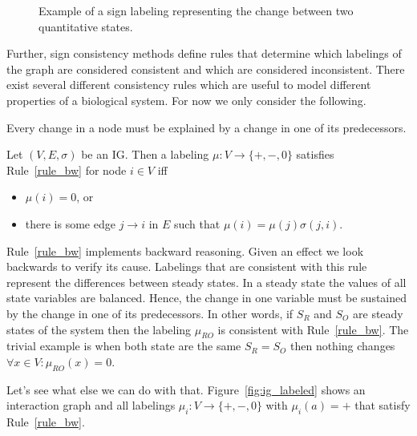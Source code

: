 \begin{figure}
  \caption{Example of a sign labeling representing the change between two quantitative states.
  }
  \label{fig:state_change}
\end{figure}

Further, sign consistency methods define rules that determine which labelings 
of the graph are considered consistent and which are considered inconsistent.
There exist several different consistency rules which are useful to model different 
properties of a biological system. 
For now we only consider the following.

\begin{srule}
\label{rule_bw}
{\upshape Every change in a node must be explained by a change in one of its predecessors.}

Let $(V, E, \sigma)$ be an IG.
Then a labeling $\mu : V \rightarrow \{\plus, \minus, 0\}$ satisfies Rule~\ref{rule_bw} for node $i \in V$ iff
\begin{itemize}
 \item $\mu(i) = 0$, or
 \item there is some edge $j \rightarrow i$ in $E$ 
       such that $\mu(i)=\mu(j)\sigma(j,i)$.
\end{itemize}

 
\end{srule}

Rule~\ref{rule_bw} implements backward reasoning.
Given an effect we look backwards to verify its cause.
Labelings that are consistent with this rule represent the differences between steady states.
In a steady state the values of all state variables are balanced. 
Hence, the change in one variable must be sustained by the change in one of its predecessors.
In other words,
 if $S_R$ and $S_O$ are steady states of the system
 then the labeling $\mu_{RO}$ is consistent with Rule~\ref{rule_bw}.
The trivial example is when both state are the same $S_R = S_O$ then nothing changes $\forall x \in V : \mu_{RO}(x) = 0$.

Let's see what else we can do with that. 
Figure~\ref{fig:ig_labeled} shows an interaction graph and all labelings $\mu_i : V \rightarrow \{\plus, \minus, 0\}$ with $\mu_i(a)=\plus$ 
that satisfy Rule~\ref{rule_bw}.

